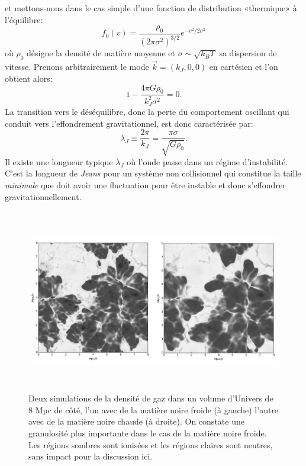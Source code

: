  et mettons-nous dans le cas simple d'une fonction de distribution «thermique» à l'équilibre:
\begin{equation}
f_0(v)=\frac{\rho_0}{(2\pi\sigma^2)^{3/2}}e^{-v^2/2\sigma^2}
\end{equation}
où $\rho_0$ désigne la densité de matière moyenne et $\sigma\sim \sqrt{k_B T}$ sa dispersion de vitesse. Prenons arbitrairement le mode $\vec{k}=(k_J,0,0)$ en cartésien et l'on obtient alors:
\begin{equation}
1-\frac{4\pi G \rho_0}{k_J^2\sigma^2}=0.
\end{equation}
La transition vers le déséquilibre, donc la perte du comportement oscillant qui conduit vers l'effondrement gravitationnel, est donc caractérisée par:
\begin{equation}
\lambda_J\equiv\frac{2\pi}{k_J}=\frac{\pi \sigma}{\sqrt{G\rho_0}}.
\end{equation} 
Il existe une longueur typique $\lambda_J$ où l'onde passe dans un régime d'instabilité. C'est la longueur de \textit{Jeans} pour un système non collisionnel qui constitue la taille \textit{minimale} que doit avoir une fluctuation pour être instable et donc s'effondrer gravitationnellement.

\begin{figure}[htbp]
	\centering
		\includegraphics[height=8cm]{figs/wdm.png}
	\caption[Deux simulations de la densité de gaz dans un volume d'Univers de 8 Mpc de côté]{Deux simulations de la densité de gaz dans un volume d'Univers de 8 Mpc de côté, l'un avec de la matière noire froide (à gauche) l'autre avec de la matière noire chaude (à droite). On constate une granulosité plus importante dans le cas de la matière noire froide. Les régions sombres sont ionisées et les régions claires sont neutres, sans impact pour la discussion ici.} 
	\label{f:wdm}
\end{figure}

